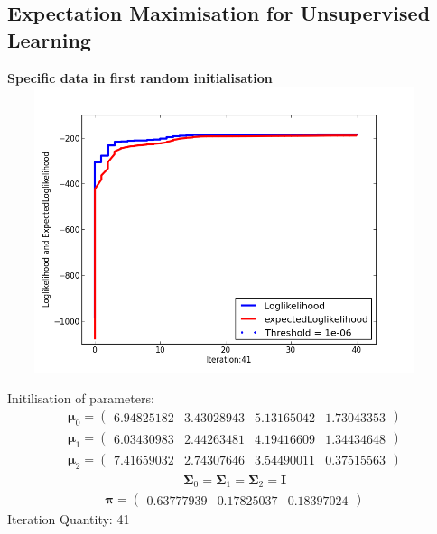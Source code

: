 \documentclass[11pt,a4paper]{article}
\newcommand{\htab}{\hspace*{0.63cm}}
\newcommand{\bs}[1]{\boldsymbol{#1}}
\begin{document}
\subsection{Expectation Maximisation for Unsupervised Learning}
\begin{center}
\textbf{Specific data in first random initialisation}
\includegraphics[width=5in,height=3.3in]{./Result/figure_1.png}
\end{center}
\htab Initilisation of parameters:
\begin{align} 
    \bs{\mu}_{0} = \begin{pmatrix} 
6.94825182 & 3.43028943 & 5.13165042 & 1.73043353 
 \end{pmatrix}   \\
    \bs{\mu}_{1} = \begin{pmatrix} 
6.03430983 & 2.44263481 & 4.19416609 & 1.34434648 
 \end{pmatrix}    \\
    \bs{\mu}_{2} = \begin{pmatrix} 
7.41659032 & 2.74307646 & 3.54490011 & 0.37515563 
    \end{pmatrix}  \end{align} \vspace{-1cm}
\begin{align} 
    \bs{\Sigma}_{0} = \bs{\Sigma}_{1} = \bs{\Sigma}_{2} = \bs{I}
\end{align} \vspace{-1cm}
\begin{align}  \bs{\pi} = \begin{pmatrix}
    0.63777939 & 0.17825037 & 0.18397024
\end{pmatrix} \end{align}
\htab Iteration Quantity: 41 \\
\end{document}
